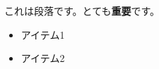 \documentclass[unicode,a4paper]{bxjsarticle}
\begin{document}
これは段落です。とても\textbf{重要}です。\par
\begin{itemize}
  \item アイテム1
  \item アイテム2
\end{itemize}
\end{document}

